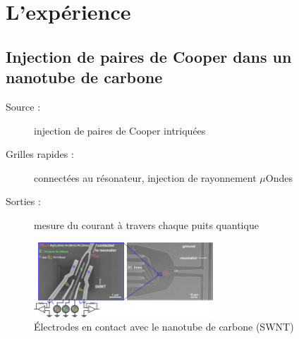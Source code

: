 \documentclass[10pt,a9paper,handout]{beamer} \usepackage[utf8]{inputenc} \usepackage[francais]{babel} \usepackage[T1]{fontenc}
\begin{document}
\section{L'expérience}
\subsection{Injection de paires de Cooper dans un nanotube de carbone}
\begin{frame}
\begin{description}
    \item[Source :] injection de paires de Cooper intriquées
    \item[Grilles rapides :] connectées au résonateur, injection de rayonnement $\mu$Ondes
    \item[Sorties :] mesure du courant à travers chaque puits quantique 
\end{description}
\begin{figure}
    \begin{center}
        \includegraphics[width=0.6\textwidth]{Images/Expe_photo}
        \caption{Électrodes en contact avec le nanotube de carbone (SWNT)}
    \end{center}
\end{figure}
\end{frame}
\end{document}
